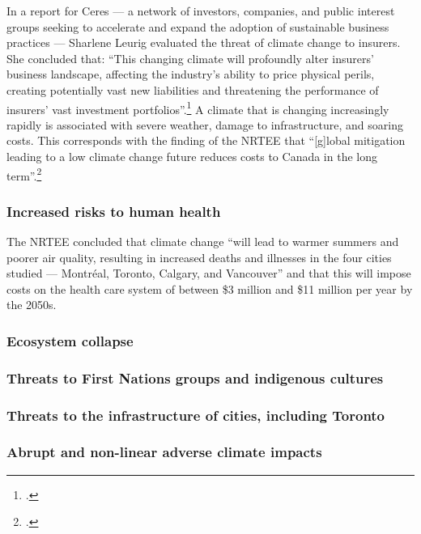 In a report for Ceres --- a  network of investors, companies, and public interest groups seeking to accelerate and expand the adoption of sustainable business practices --- Sharlene Leurig evaluated the threat of climate change to insurers.
She concluded that: ``This changing climate will profoundly alter insurers' business landscape, affecting the industry's ability to price physical perils, creating potentially vast new liabilities and threatening the performance of insurers' vast investment portfolios''.\footcite[][p. 9]{ClimateRiskInsurers}
A climate that is changing increasingly rapidly is associated with severe weather, damage to infrastructure, and soaring costs.
This corresponds with the finding of the NRTEE that ``[g]lobal mitigation leading to a low climate change future reduces costs to Canada in the long term''.\footcite[][p. 16]{NRTEEPrice}


	\subsubsection{Increased risks to human health}



The NRTEE concluded that climate change ``will lead to warmer summers and poorer air quality, resulting in increased deaths and illnesses in the four cities studied — Montréal, Toronto, Calgary, and Vancouver'' and that this will impose costs on the health care system of between \$3 million and \$11 million per year by the 2050s.


	\subsubsection{Ecosystem collapse}
	
	
	\subsubsection{Threats to First Nations groups and indigenous cultures}
	
	
	\subsubsection{Threats to the infrastructure of cities, including Toronto}
	
	
	\subsubsection{Abrupt and non-linear adverse climate impacts}



